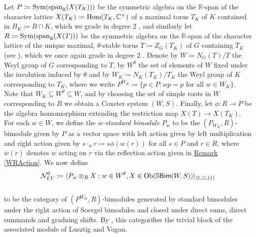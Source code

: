\noindent %
Let $P \coloneqq \textnormal{Sym}(\textnormal{span}_\mathbb{R}(X(T_K)))$ be the symmetric algebra on the $\mathbb{R}$-span of the character lattice $X(T_K) \coloneqq \textnormal{Hom}(T_K, \mathbb{C}^\times)$ of a maximal torus $T_K$ of $K$ contained in $B_K \coloneqq B \cap K$, which we grade in degree $2$%
, and similarly let $R \coloneqq \textnormal{Sym}(\textnormal{span}_\mathbb{R}(X(T)))$ be the symmetric algebra on the $\mathbb{R}$-span of the character lattice of the unique maximal, $\theta$-stable torus $T \coloneqq Z_G(T_K)$ of $G$ containing $T_K$ (see \cite[Lemma 6.1.2]{LR22}), which we once again grade in degree $2$%
. Denote by $W \coloneqq N_G(T)/T$ the Weyl group of $G$ corresponding to $T$, by $W^\theta$ the set of elements of $W$ fixed under the involution induced by $\theta$ and by $W_K \coloneqq N_K(T_K)/T_K$ the Weyl group of $K$ corresponding to $T_K$, where we write $P^{W_K} \coloneqq \{p \in P : wp = p\text{ for all }w \in W_K\}$. Note that $W_K \subseteq W^\theta \subseteq W$, and by choosing the set of simple roots in $W$ corresponding to $B$ we obtain a Coxeter system $(W, S)$. Finally, let $\phi : R \to P$ be the algebra homomorphism extending the restriction map $X(T) \to X(T_K)$. For each $w \in W$, we define the {\em $w$-standard bimodule} $P_w$ to be the $(P_{W_K}, R)$-bimodule given by $P$ as a vector space with left action given by left multiplication and right action given by $s\cdot_w r \coloneqq s\phi(w(r))$ for all $s \in P$ and $r \in R$, where $w(r)$ denotes $w$ acting on $r$ via the reflection action given in \hyperref[WRAction]{Remark \ref*{WRAction}}. We now define\\[-\linespacing]
\begin{align*}
\begin{split}
\mathcal{N}_{LV}^0 \coloneqq \langle P_w \otimes_R X : w \in W^\theta, X \in \textnormal{Ob}(\mathbb{S}\textnormal{\textsf{Bim}}(W, S))\rangle_{\oplus,\ominus,(1)}
\end{split}
\end{align*}
\noindent\\[-\linespacing] to be the category of $(P^{W_K}, R)$-bimodules generated by standard bimodules under the right action of Soergel bimodules and closed under direct sums, direct summands and gradning shifts. By \cite[Theorem 1.3.1]{LR22}, this categorifies the trivial block of the associated module of Lusztig and Vogan.\\

